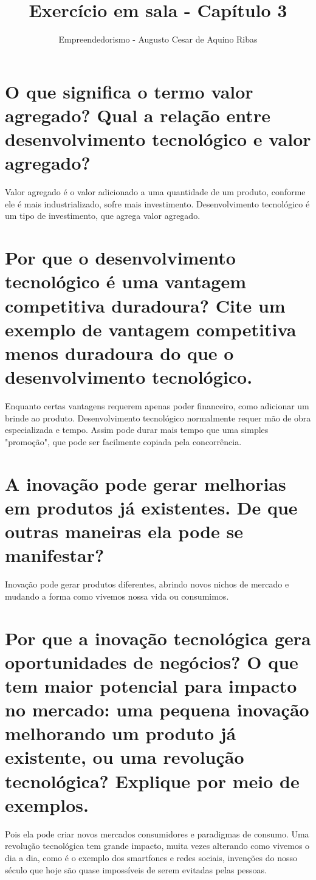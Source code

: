 \documentclass[a4paper,10pt]{article}
\author{Empreendedorismo - Augusto Cesar de Aquino Ribas}
\title{Exercício em sala - Capítulo 3}
\begin{document}
\maketitle

\section{O que significa o termo valor agregado? Qual a relação entre desenvolvimento tecnológico e valor agregado?}

Valor agregado é o valor adicionado a uma quantidade de um produto, conforme ele é mais industrializado, sofre mais investimento. Desenvolvimento tecnológico é um tipo de investimento, que agrega valor agregado. 


\section{Por que o desenvolvimento tecnológico é uma vantagem competitiva duradoura? Cite um exemplo de vantagem competitiva menos duradoura do que o desenvolvimento tecnológico.}

Enquanto certas vantagens requerem apenas poder financeiro, como adicionar um brinde ao produto. Desenvolvimento tecnológico normalmente requer mão de obra especializada e tempo. Assim pode durar mais tempo que uma simples "promoção", que pode ser facilmente copiada pela concorrência.


\section{A inovação pode gerar melhorias em produtos já existentes. De que outras maneiras ela pode se manifestar?}

Inovação pode gerar produtos diferentes, abrindo novos nichos de mercado e mudando a forma como vivemos nossa vida ou consumimos.


\section{Por que a inovação tecnológica gera oportunidades de negócios? O que tem maior potencial para impacto no mercado: uma pequena inovação melhorando um produto já existente, ou uma revolução tecnológica? Explique por meio de exemplos.}

Pois ela pode criar novos mercados consumidores e paradigmas de consumo. Uma revolução tecnológica tem grande impacto, muita vezes alterando como vivemos o dia a dia, como é o exemplo dos smartfones e redes sociais, invenções do nosso século que hoje são quase impossíveis de serem evitadas pelas pessoas.
\end{document}

